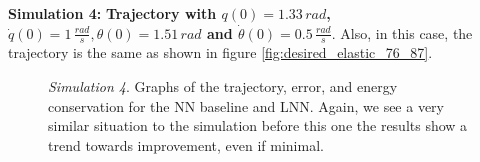 \documentclass[a4paper]{article}
\begin{document}
\textbf{Simulation 4:} \textbf{Trajectory with $q(0)=1.33\, rad$, $\dot{q}(0)=1\, \frac{rad}{s}, \theta(0)=1.51\, rad$ and $\dot{\theta}(0)=0.5\, \frac{rad}{s}.$}
Also, in this case, the trajectory is the same as shown in figure \ref{fig:desired_elastic_76_87}.

\begin{figure}
    \centering
    \qquad
    \caption{\textit{Simulation 4}. Graphs of the trajectory, error, and energy conservation for the NN baseline and LNN. Again, we see a very similar situation to the simulation before this one the results show a trend towards improvement, even if minimal.}
    \label{fig:elastic_500_76_87}
\end{figure}
\end{document}
